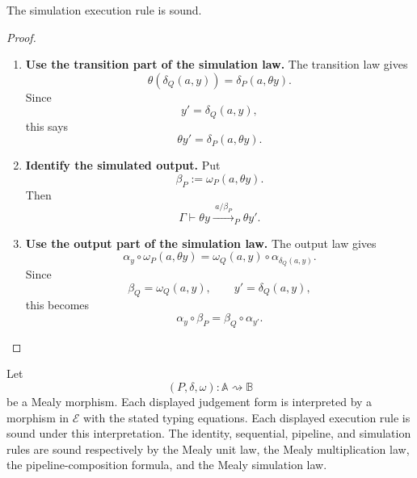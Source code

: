 \begin{proposition}
\label{prop:soundness-simulation-execution}
    The simulation execution rule is sound.
\end{proposition}

\begin{proof}
    \leavevmode
    \begin{enumerate}
        \item \textbf{Use the transition part of the simulation law.}
        The transition law gives
        \[
            \theta(\delta_Q(a,y))
            =
            \delta_P(a,\theta y).
        \]
        Since
        \[
            y'=\delta_Q(a,y),
        \]
        this says
        \[
            \theta y'=\delta_P(a,\theta y).
        \]

        \item \textbf{Identify the simulated output.}
        Put
        \[
            \beta_P:=\omega_P(a,\theta y).
        \]
        Then
        \[
            \Gamma\vdash
            \theta y\xrightarrow{\;a/\beta_P\;}_{P}\theta y'.
        \]

        \item \textbf{Use the output part of the simulation law.}
        The output law gives
        \[
            \alpha_y\circ \omega_P(a,\theta y)
            =
            \omega_Q(a,y)\circ \alpha_{\delta_Q(a,y)}.
        \]
        Since
        \[
            \beta_Q=\omega_Q(a,y),
            \qquad
            y'=\delta_Q(a,y),
        \]
        this becomes
        \[
            \alpha_y\circ\beta_P
            =
            \beta_Q\circ\alpha_{y'}.
        \]
    \end{enumerate}
\end{proof}

\begin{theorem}
\label{thm:soundness-operational-calculus}
    Let
    \[
        (P,\delta,\omega):\mathbb A\rightsquigarrow\mathbb B
    \]
    be a Mealy morphism. Each displayed judgement form is interpreted by a
    morphism in \(\mathcal E\) with the stated typing equations. Each displayed
    execution rule is sound under this interpretation. The identity,
    sequential, pipeline, and simulation rules are sound respectively by the
    Mealy unit law, the Mealy multiplication law, the pipeline-composition
    formula, and the Mealy simulation law.
\end{theorem}

